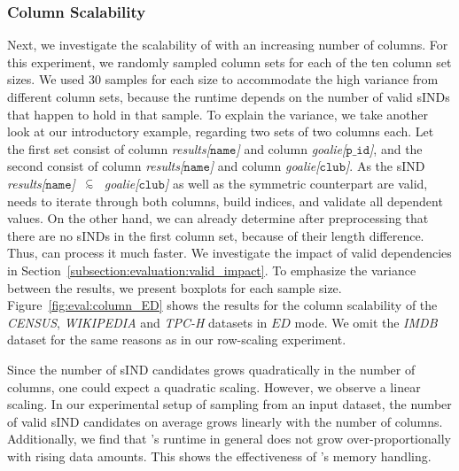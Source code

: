 \subsubsection{Column Scalability}
Next, we investigate the scalability of \sawfish with an increasing number of columns.
For this experiment, we randomly sampled column sets for each of the ten column set sizes.
We used 30 samples for each size to accommodate the high variance from different column sets, because the runtime depends on the number of valid sINDs that happen to hold in that sample.
To explain the variance, we take another look at our introductory example, regarding two sets of two columns each.
Let the first set consist of column \mbox{\emph{results[$\mathtt{name}$]}} and column \mbox{\emph{goalie[$\mathtt{p\_id}$]}}, and the second consist of column \emph{results[$\mathtt{name}$]} and column \emph{goalie[$\mathtt{club}$]}.
As the sIND \emph{results[$\mathtt{name}$]~$\simIND{}$~goalie[$\mathtt{club}$]} as well as the symmetric counterpart are valid, \sawfish needs to iterate through both columns, build indices, and validate all dependent values.
On the other hand, we can already determine after preprocessing that there are no sINDs in the first column set, because of their length difference.
Thus, \sawfish can process it much faster.
We investigate the impact of valid dependencies in Section~\ref{subsection:evaluation:valid_impact}.
To emphasize the variance between the results, we present boxplots for each sample size.
Figure~\ref{fig:eval:column_ED} shows the results for the column scalability of the \emph{CENSUS}, \emph{WIKIPEDIA} and \emph{TPC-H} datasets in $ED$ mode.
We omit the \emph{IMDB} dataset for the same reasons as in our row-scaling experiment.

Since the number of sIND candidates grows quadratically in the number of columns, one could expect a quadratic scaling.
However, we observe a linear scaling.
In our experimental setup of sampling from an input dataset, the number of valid sIND candidates on average grows linearly with the number of columns.
Additionally, we find that \sawfish's runtime in general does not grow over-proportionally with rising data amounts.
This shows the effectiveness of \sawfish's memory handling.

